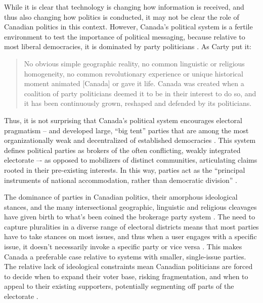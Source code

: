While it is clear that technology is changing how information is received, and
thus also changing how politics is conducted, it may not be clear the role of
Canadian politics in this context. However, Canada’s political system is a
fertile environment to test the importance of political messaging, because
relative to most liberal democracies, it is dominated by party
politicians \cite{cross2004contours}. As Carty put it: 

\begin{quote}
  No obvious simple geographic reality, no common linguistic or religious
  homogeneity, no common revolutionary experience or unique historical moment
  animated [Canada] or gave it life. Canada was created when a coalition of party
  politicians deemed it to be in their interest to do so, and it has been
  continuously grown, reshaped and defended by its politicians.\cite{carty2010political}
\end{quote}

Thus, it is not surprising that Canada’s political system
encourages electoral pragmatism – and developed large, ``big tent'' parties that
are among the most organizationally weak and decentralized of established
democracies \cite{cross2004contours}. This system defines political parties as brokers of the often
conflicting, weakly integrated electorate –- as opposed to mobilizers of
distinct communities, articulating claims rooted in their pre-existing
interests. In this way, parties act as the ``principal instruments of national
accommodation, rather than democratic division'' \cite{carty2010political}.

The dominance of parties in Canadian politics, their amorphous ideological
stances, and the many intersectional geographic, linguistic and religious
cleavages have given birth to what’s been coined the brokerage party system
\cite{carty2010political}. The need to capture pluralities in a diverse range of
electoral districts means that most parties have to take stances on most issues,
and thus when a user engages with a specific issue, it doesn’t necessarily
invoke a specific party or vice versa \cite{franklin1992decline}. This makes Canada a preferable case
relative to systems with smaller, single-issue parties. The relative lack of
ideological constraints mean Canadian politicians are forced to decide when to
expand their voter base, risking fragmentation, and when to appeal to their
existing supporters, potentially segmenting off parts of the electorate
\cite{schipper2018political,franklin1992decline}. 

